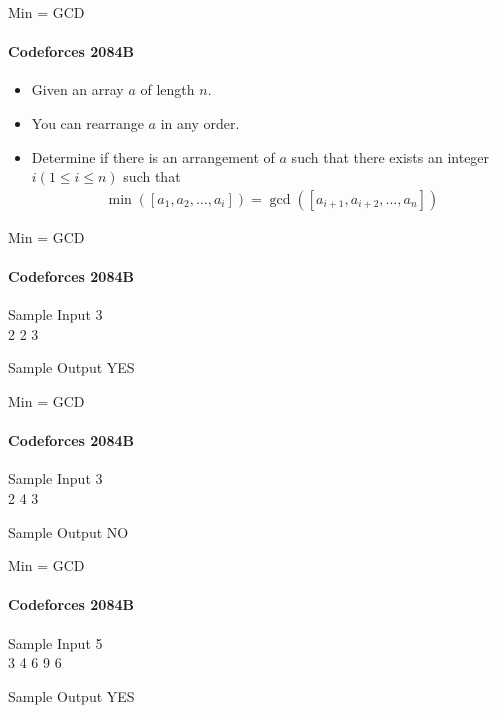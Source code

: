 \begin{frame}{Min = GCD}
	\framesubtitle{Codeforces 2084B}
	\begin{itemize}
		\item<1-> Given an array $a$ of length $n$.
		\item<2-> You can rearrange $a$ in any order.
		\item<3-> Determine if there is an arrangement of $a$ such that there exists an integer $i (1 \leq i \leq n)$ such that
		      \begin{align*}
			      \min([a_1, a_2, \ldots, a_i]) = \gcd([a_{i+1}, a_{i+2}, \ldots, a_n])
		      \end{align*}
	\end{itemize}
\end{frame}

\begin{frame}{Min = GCD}
	\framesubtitle{Codeforces 2084B}
	\begin{block}{Sample Input}
		3 \\
		2 2 3
	\end{block}
	\begin{block}{Sample Output}
		YES
	\end{block}
\end{frame}

\begin{frame}{Min = GCD}
	\framesubtitle{Codeforces 2084B}
	\begin{block}{Sample Input}
		3 \\
		2 4 3
	\end{block}
	\begin{block}{Sample Output}
		NO
	\end{block}
\end{frame}

\begin{frame}{Min = GCD}
	\framesubtitle{Codeforces 2084B}
	\begin{block}{Sample Input}
		5 \\
		3 4 6 9 6
	\end{block}
	\begin{block}{Sample Output}
		YES
	\end{block}
\end{frame}

